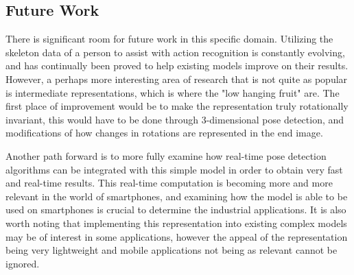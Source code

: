 \subsection{Future Work}

There is significant room for future work in this specific domain. Utilizing the skeleton data of a person to assist with action recognition is constantly evolving, and has continually been proved to help existing models improve on their results. However, a perhaps more interesting area of research that is not quite as popular is intermediate representations, which is where the "low hanging fruit" are. The first place  of improvement would be to make the representation truly rotationally invariant, this would have to be done through 3-dimensional pose detection, and modifications of how changes in rotations are represented in the end image. 

Another path forward is to more fully examine how real-time pose detection algorithms can be integrated with this simple model in order to obtain very fast and real-time results. This real-time computation is becoming more and more relevant in the world of smartphones, and examining how the model is able to be used on smartphones is crucial to determine the industrial applications. It is also worth noting that implementing this representation into existing complex models may be of interest in some applications, however the appeal of the representation being very lightweight and mobile applications not being as relevant cannot be ignored.
